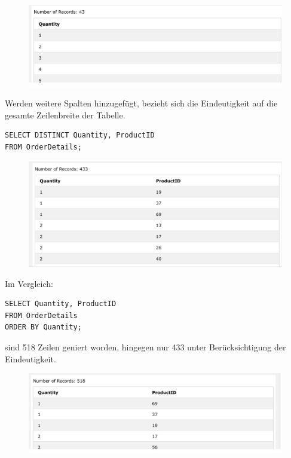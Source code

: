 \begin{figure}[H]
	\centering
	\includegraphics[scale = 0.3]{attachment/chapter_3/Scc054}
	\caption{}
	\label{fig:Scc054}
\end{figure}

Werden weitere Spalten hinzugefügt, bezieht sich die Eindeutigkeit auf die gesamte Zeilenbreite der Tabelle. 

\begin{lstlisting}[style=SQL]
SELECT DISTINCT Quantity, ProductID
FROM OrderDetails;
\end{lstlisting}


\begin{figure}[H]
	\centering
	\includegraphics[scale = 0.3]{attachment/chapter_3/Scc055}
	\caption{}
	\label{fig:Scc055}
\end{figure}

Im Vergleich: 
\begin{lstlisting}[style=SQL]
SELECT Quantity, ProductID
FROM OrderDetails
ORDER BY Quantity;
\end{lstlisting}

sind 518 Zeilen geniert worden, hingegen nur 433 unter Berücksichtigung der Eindeutigkeit.
\begin{figure}[H]
	\centering
	\includegraphics[scale = 0.3]{attachment/chapter_3/Scc056}
	\caption{}
	\label{fig:Scc056}
\end{figure}

